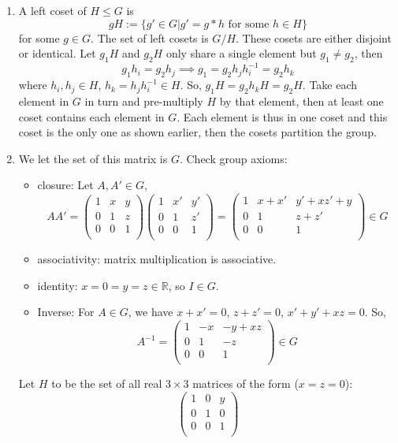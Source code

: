 \documentclass[a4paper]{article}
\begin{document}
\begin{ans}\leavevmode
\begin{enumerate}[label=(\alph*)]
\item A left coset of $H\leq G$ is 
$$gH:=\{g'\in G|g'=g*h\text{ for some }h\in H\}$$
for some $g\in G$. The set of left cosets is $G/H$. These cosets are either disjoint or identical. Let $g_1H$ and $g_2H$ only share a single element but $g_1\neq g_2$, then $$g_1h_i=g_2h_j\implies g_1=g_2h_jh_i^{-1}=g_2h_k$$
where $h_i,h_j\in H$, $h_k=h_jh_i^{-1}\in H$. So, $g_1H=g_2h_kH=g_2H$. Take each element in $G$ in turn and pre-multiply $H$ by that element, then at least one coset contains each element in $G$. Each element is thus in one coset and this coset is the only one as shown earlier, then the cosets partition the group.
\item We let the set of this matrix is $G$. Check group axioms:
\begin{itemize}
    \item closure: Let $A,A'\in G$,
    $$AA'= \begin{pmatrix}1&x&y\\0&1&z\\0&0&1\\\end{pmatrix} \begin{pmatrix}1&x'&y'\\0&1&z'\\0&0&1\\\end{pmatrix}= \begin{pmatrix}1&x+x'&y'+xz'+y\\0&1&z+z'\\0&0&1\\\end{pmatrix}\in G$$
    \item associativity: matrix multiplication is associative.
    \item identity: $x=0=y=z\in\mathbb{R}$, so $I\in G$.
    \item Inverse: For $A\in G$, we have $x+x'=0$, $z+z'=0$, $x'+y'+xz=0$. So, $$A^{-1}= \begin{pmatrix}1&-x&-y+xz\\0&1&-z\\0&0&1\\\end{pmatrix}\in G$$
\end{itemize}
Let $H$ to be the set of all real $3\times 3$ matrices of the form ($x=z=0$):
$$\begin{pmatrix}1&0&y\\0&1&0\\0&0&1\\\end{pmatrix}$$

\end{enumerate}
\end{ans}
\end{document}

